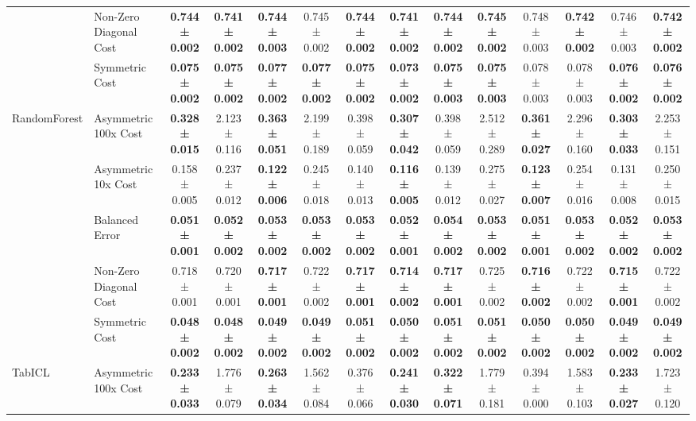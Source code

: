 \begin{table}[H]
{\begin{tabular}{llcccccccccccc}
 & Non-Zero Diagonal Cost & \textbf{0.744 ± 0.002} & \textbf{0.741 ± 0.002} & \textbf{0.744 ± 0.003} & 0.745 ± 0.002 & \textbf{0.744 ± 0.002} & \textbf{0.741 ± 0.002} & \textbf{0.744 ± 0.002} & \textbf{0.745 ± 0.002} & 0.748 ± 0.003 & \textbf{0.742 ± 0.002} & 0.746 ± 0.003 & \textbf{0.742 ± 0.002} \\
 & Symmetric Cost & \textbf{0.075 ± 0.002} & \textbf{0.075 ± 0.002} & \textbf{0.077 ± 0.002} & \textbf{0.077 ± 0.002} & \textbf{0.075 ± 0.002} & \textbf{0.073 ± 0.002} & \textbf{0.075 ± 0.003} & \textbf{0.075 ± 0.003} & 0.078 ± 0.003 & 0.078 ± 0.003 & \textbf{0.076 ± 0.002} & \textbf{0.076 ± 0.002} \\
\cline{1-14}
\multirow[t]{5}{*}{RandomForest} & Asymmetric 100x Cost & \textbf{0.328 ± 0.015} & 2.123 ± 0.116 & \textbf{0.363 ± 0.051} & 2.199 ± 0.189 & 0.398 ± 0.059 & \textbf{0.307 ± 0.042} & 0.398 ± 0.059 & 2.512 ± 0.289 & \textbf{0.361 ± 0.027} & 2.296 ± 0.160 & \textbf{0.303 ± 0.033} & 2.253 ± 0.151 \\
 & Asymmetric 10x Cost & 0.158 ± 0.005 & 0.237 ± 0.012 & \textbf{0.122 ± 0.006} & 0.245 ± 0.018 & 0.140 ± 0.013 & \textbf{0.116 ± 0.005} & 0.139 ± 0.012 & 0.275 ± 0.027 & \textbf{0.123 ± 0.007} & 0.254 ± 0.016 & 0.131 ± 0.008 & 0.250 ± 0.015 \\
 & Balanced Error & \textbf{0.051 ± 0.001} & \textbf{0.052 ± 0.002} & \textbf{0.053 ± 0.002} & \textbf{0.053 ± 0.002} & \textbf{0.053 ± 0.002} & \textbf{0.052 ± 0.001} & \textbf{0.054 ± 0.002} & \textbf{0.053 ± 0.002} & \textbf{0.051 ± 0.001} & \textbf{0.053 ± 0.002} & \textbf{0.052 ± 0.002} & \textbf{0.053 ± 0.002} \\
 & Non-Zero Diagonal Cost & 0.718 ± 0.001 & 0.720 ± 0.001 & \textbf{0.717 ± 0.001} & 0.722 ± 0.002 & \textbf{0.717 ± 0.001} & \textbf{0.714 ± 0.002} & \textbf{0.717 ± 0.001} & 0.725 ± 0.002 & \textbf{0.716 ± 0.002} & 0.722 ± 0.002 & \textbf{0.715 ± 0.001} & 0.722 ± 0.002 \\
 & Symmetric Cost & \textbf{0.048 ± 0.002} & \textbf{0.048 ± 0.002} & \textbf{0.049 ± 0.002} & \textbf{0.049 ± 0.002} & \textbf{0.051 ± 0.002} & \textbf{0.050 ± 0.002} & \textbf{0.051 ± 0.002} & \textbf{0.051 ± 0.002} & \textbf{0.050 ± 0.002} & \textbf{0.050 ± 0.002} & \textbf{0.049 ± 0.002} & \textbf{0.049 ± 0.002} \\
\cline{1-14}
\multirow[t]{5}{*}{TabICL} & Asymmetric 100x Cost & \textbf{0.233 ± 0.033} & 1.776 ± 0.079 & \textbf{0.263 ± 0.034} & 1.562 ± 0.084 & 0.376 ± 0.066 & \textbf{0.241 ± 0.030} & \textbf{0.322 ± 0.071} & 1.779 ± 0.181 & 0.394 ± 0.000 & 1.583 ± 0.103 & \textbf{0.233 ± 0.027} & 1.723 ± 0.120 \\

\end{tabular}}
\end{table}
